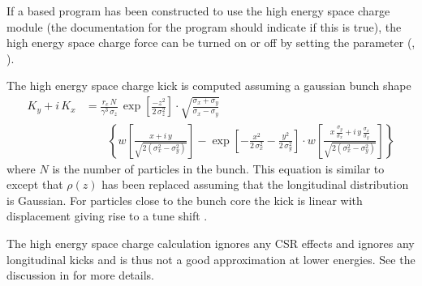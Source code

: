 If a \bmad based program has been constructed to use the high energy space charge module (the
documentation for the program should indicate if this is true), the high energy space charge force
can be turned on or off by setting the  parameter
(, ). 

The high energy space charge kick is computed assuming a gaussian bunch shape 
\begin{align}
  K_y + i \, K_x &=
  \frac{r_e \, N}{\gamma^3 \, \sigma_z} \, \exp \left[ \frac{-z^2}{2 \, \sigma_z^2} \right] \cdot
  \sqrt{\frac{\sigma_x + \sigma_y}{\sigma_x - \sigma_y}} \label{fsp1r2} \\
  & \qquad \left\{ w \left[ \frac{x + i \, y}{\sqrt{2 (\sigma_x^2 - \sigma_y^2)}} \right] -
  \exp \left[ -\frac{x^2}{2 \, \sigma_x^2} - \frac{y^2}{2 \, \sigma_y^2} \right] \cdot
  w \left[ \frac{x \, \frac{\sigma_y}{\sigma_x} + i \, y \, \frac{\sigma_x}{\sigma_y}}
  {\sqrt{2 (\sigma_x^2 - \sigma_y^2)}} \right] \right\}
  \nonumber 
\end{align}
where $N$ is the number of particles in the bunch. This equation is similar to  except
that $\rho(z)$ has been replaced assuming that the longitudinal distribution is Gaussian. For
particles close to the bunch core the kick is linear with displacement giving rise to a tune shift
\cite{b:decking}.

The high energy space charge calculation ignores any CSR effects and ignores any longitudinal kicks
and is thus not a good approximation at lower energies. See the discussion in \cite{b:csr} for more
details.






